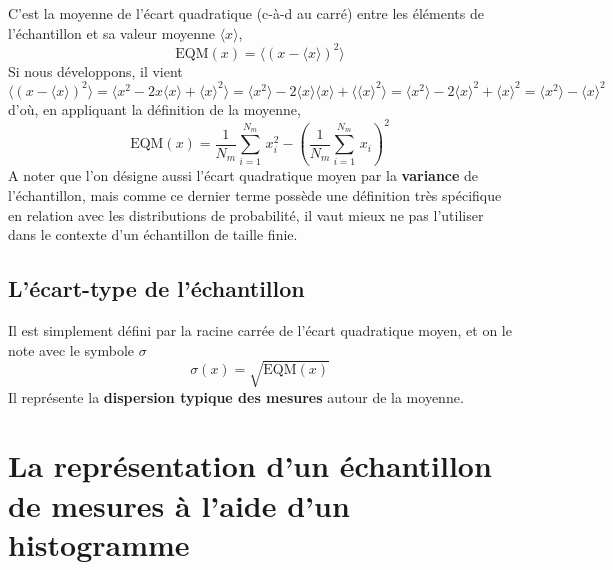 C'est la moyenne de l'écart quadratique (c-à-d au carré) entre les éléments de l'échantillon et sa valeur moyenne $\langle x\rangle$,
\begin{equation}
\text{EQM}(x)=\langle (x-\langle x\rangle)^2\rangle
\end{equation}
Si nous développons, il vient
$$
\langle (x-\langle x\rangle)^2\rangle=\langle x^2-2x\langle x\rangle+\langle x\rangle^2\rangle
=\langle x^2\rangle-2\langle x\rangle\langle x\rangle+\langle\langle x\rangle^2\rangle
=\langle x^2\rangle-2\langle x\rangle^2+\langle x\rangle^2
=\langle x^2\rangle-\langle x\rangle^2
$$
d'où, en appliquant la définition de la moyenne,
\begin{equation}
\text{EQM}(x)=\frac{1}{N_m}\sum\limits_{i=1}^{N_m}\,x_i^2-
\left(\frac{1}{N_m}\sum\limits_{i=1}^{N_m}\,x_i\right)^2
\end{equation}
A noter que l'on désigne aussi l'écart quadratique moyen par la \textbf{variance} de l'échantillon, mais comme ce dernier terme possède une définition très spécifique en relation avec les distributions de probabilité, il vaut mieux ne pas l'utiliser dans le contexte d'un échantillon de taille finie.

\subsection{L'écart-type de l'échantillon}

Il est simplement défini par la racine carrée de l'écart quadratique moyen, et on le note avec le symbole $\sigma$
\begin{equation}
\sigma(x)=\sqrt{\text{EQM}(x)}
\end{equation}
Il représente la \textbf{dispersion typique des mesures} autour de la moyenne.
\vspace{3mm}
\begin{center}
\end{center}

\section{La représentation d'un échantillon de mesures à l'aide d'un histogramme}


